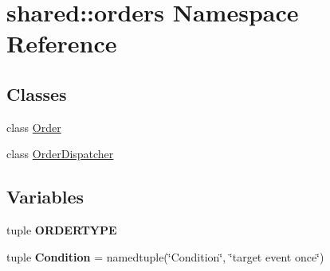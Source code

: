 \hypertarget{namespaceshared_1_1orders}{\section{shared\-:\-:orders \-Namespace \-Reference}
\label{namespaceshared_1_1orders}
}
\subsection*{\-Classes}
\begin{DoxyCompactItemize}
\item 
class \hyperlink{classshared_1_1orders_1_1_order}{\-Order}
\item 
class \hyperlink{classshared_1_1orders_1_1_order_dispatcher}{\-Order\-Dispatcher}
\end{DoxyCompactItemize}
\subsection*{\-Variables}
\begin{DoxyCompactItemize}
\item 
tuple {\bfseries \-O\-R\-D\-E\-R\-T\-Y\-P\-E}
\item 
\hypertarget{namespaceshared_1_1orders_a607645acfe014b5edd5ea3642b78353e}{tuple {\bfseries \-Condition} = namedtuple(\char`\"{}\-Condition\char`\"{}, \char`\"{}target event once\char`\"{})}\label{namespaceshared_1_1orders_a607645acfe014b5edd5ea3642b78353e}

\end{DoxyCompactItemize}


